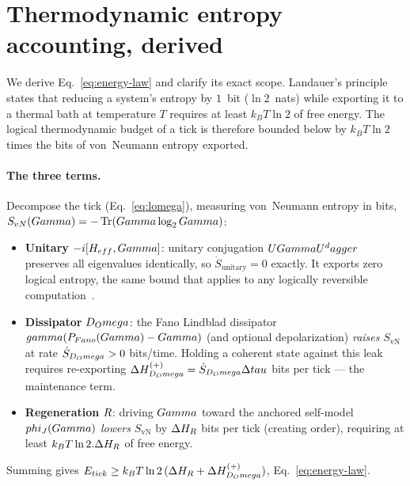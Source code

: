 \section{Thermodynamic entropy accounting, derived}
\label{app:energy}

We derive Eq.~\eqref{eq:energy-law} and clarify its exact scope. Landauer's
principle~\cite{landauer1961} states that reducing a system's entropy by $1$~bit
($\ln 2$~nats) while exporting it to a thermal bath at temperature $T$ requires
at least $k_B T\ln 2$ of free energy. The logical thermodynamic budget of a
tick is therefore bounded below by $k_B T\ln 2$ times the bits of von~Neumann
entropy exported.

\paragraph{The three terms.} Decompose the tick (Eq.~\ref{eq:lomega}), measuring
von~Neumann entropy in bits, $S_{vN}(Gamma)=-\Tr(Gamma\log_2Gamma)$:
\begin{itemize}[leftmargin=1.5em,itemsep=1pt]
  \item \textbf{Unitary} $-i[H_{eff},Gamma]$: unitary conjugation
        $UGamma U^dagger$ preserves all eigenvalues identically, so
        $\dot S_{\mathrm{unitary}}=0$ exactly. It exports zero logical entropy,
        the same bound that applies to any logically reversible
        computation~\cite{bennett1973}.
  \item \textbf{Dissipator} $D_Omega$: the Fano Lindblad dissipator
        $gamma(P_{Fano}(Gamma)-Gamma)$ (and optional
        depolarization) \emph{raises} $S_{\mathrm{vN}}$ at rate
        $\dot S_{D_Omega}>0$ bits/time. Holding a coherent state against this leak
        requires re-exporting $\Delta H_{D_Omega}^{(+)}=\dot S_{D_Omega}\Delta tau$
        bits per tick --- the maintenance term.
  \item \textbf{Regeneration} $R$: driving $Gamma$ toward the anchored
        self-model $phi_J(Gamma)$ \emph{lowers} $S_{\mathrm{vN}}$ by
        $\Delta H_{R}$ bits per tick (creating order), requiring at least
        $k_B T\ln 2.\Delta H_{R}$ of free energy.
\end{itemize}
Summing gives $E_{tick}\ge k_B T\ln 2\,(\Delta H_{R}+\Delta H_{D_Omega}^{(+)})$,
Eq.~\eqref{eq:energy-law}.

